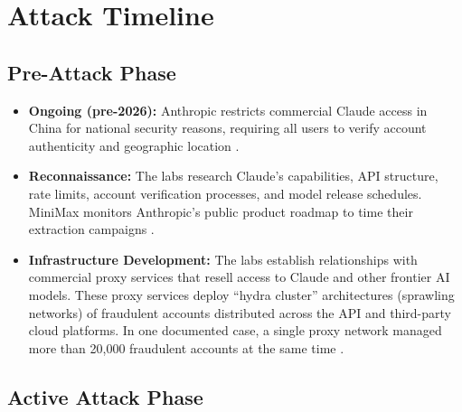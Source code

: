 \documentclass[11pt,a4paper]{article}
\begin{document}
\newpage

\section{Attack Timeline}

\subsection{Pre-Attack Phase}

\begin{itemize}[leftmargin=20pt, noitemsep]
    \item \textbf{Ongoing (pre-2026):} Anthropic restricts commercial Claude access in China for national security reasons, requiring all users to verify account authenticity and geographic location \cite{anthropic_blog}.
    \item \textbf{Reconnaissance:} The labs research Claude's capabilities, API structure, rate limits, account verification processes, and model release schedules. MiniMax monitors Anthropic's public product roadmap to time their extraction campaigns \cite{anthropic_blog}.
    \item \textbf{Infrastructure Development:} The labs establish relationships with commercial proxy services that resell access to Claude and other frontier AI models. These proxy services deploy ``hydra cluster'' architectures (sprawling networks) of fraudulent accounts distributed across the API and third-party cloud platforms. In one documented case, a single proxy network managed more than 20,000 fraudulent accounts at the same time \cite{anthropic_blog}.
\end{itemize}

\subsection{Active Attack Phase}
\end{document}

